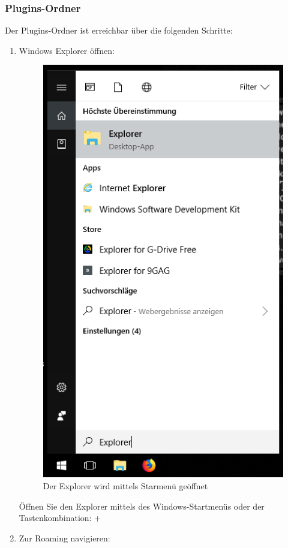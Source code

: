 \documentclass{book}
\begin{document}
			\subsubsection{Plugins-Ordner}
				Der Plugins-Ordner ist erreichbar über die folgenden Schritte:
				\begin{enumerate}
					\item Windows Explorer öffnen:\\
						\begin{figure}[H]
							\centering
							\includegraphics[scale=0.5]{pics/plugins-ordner/Explorer-oeffnen.png}
							\caption{Der Explorer wird mittels Starmenü geöffnet}
						\end{figure}
						Öffnen Sie den Explorer mittels des Windows-Startmenüs oder der Tastenkombination: +
						\label{explorer oeffnen}
					\item Zur Roaming navigieren:\\

\end{enumerate}
\end{document}
